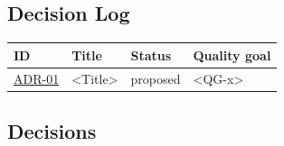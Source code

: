 
\subsection{Decision Log}
\begin{longtable}{@{}p{1.9cm}p{6.6cm}p{2.4cm}p{3.6cm}@{}}
\toprule
ID & Title & Status & Quality goal \\
\midrule
\endhead
\hyperref[adr:01]{ADR-01} & <Title> & proposed & <QG-x> \\
\bottomrule
\end{longtable}
 
\subsection{Decisions}

% 

